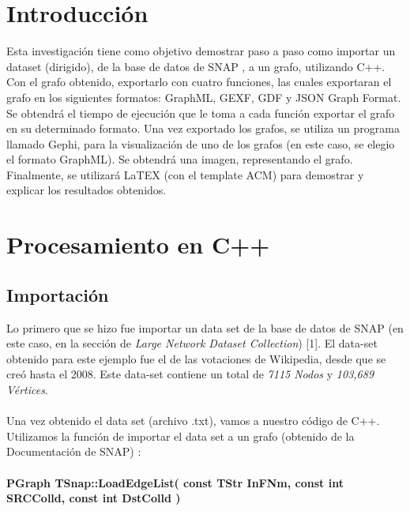 \documentclass[acmlarge,screen]{acmart}
\begin{document}
\maketitle

\section{Introducción}
Esta investigación tiene como objetivo demostrar paso a paso como importar un dataset (dirigido), de la base de datos de SNAP \cite{SNAPdata}, a un grafo, utilizando C++. Con el grafo obtenido, exportarlo con cuatro funciones, las cuales exportaran el grafo en los siguientes formatos: GraphML, GEXF, GDF y JSON Graph Format. Se obtendrá el tiempo de ejecución que le toma a cada función exportar el grafo en su determinado formato. Una vez exportado los grafos, se utiliza un programa llamado Gephi, para la visualización de uno de los grafos (en este caso, se elegio el formato GraphML). Se obtendrá una imagen, representando el grafo. Finalmente, se utilizará LaTEX (con el template ACM) para demostrar y explicar los resultados obtenidos.

\section{Procesamiento en C++}

\subsection{Importación}
Lo primero que se hizo fue importar un data set de la base de datos de SNAP (en este caso, en la sección de {\it Large Network Dataset Collection}) [1]. El data-set obtenido para este ejemplo fue el de las votaciones de Wikipedia, desde que se creó hasta el 2008. Este data-set contiene un total de {\it 7115 Nodos} y {\it 103,689 Vértices}.\\ \\ Una vez obtenido el data set (archivo .txt), vamos a nuestro código de C++. Utilizamos la función de importar el data set a un grafo (obtenido de la Documentación de SNAP) \cite{SNAPdev}:
\\ \\
\textbf{ PGraph TSnap::LoadEdgeList( const TStr InFNm, const int SRCColld, const int DstColld )}

\pagebreak
\end{document}
